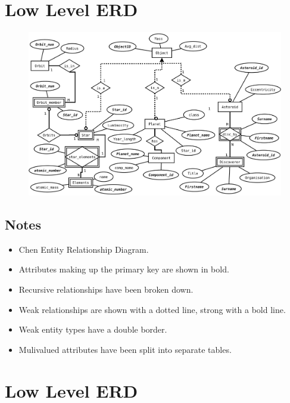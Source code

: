 \documentclass[11pt]{article} %
\begin{document}


\newpage
\section{Low Level ERD}

\begin{figure}[h]
	\centering
	\includegraphics[width=1.0\textwidth]{ERD-low-Chen.pdf}
\end{figure}

\subsection{Notes}

\begin{itemize}
	\item Chen Entity Relationship Diagram.
	\item Attributes making up the primary key are shown in bold.
	\item Recursive relationships have been broken down.
	\item Weak relationships are shown with a dotted line, strong with a bold
		line.
	\item Weak entity types have a double border.
	\item Mulivalued attributes have been split into separate tables.
\end{itemize}



\newpage
\section{Low Level ERD}
\end{document}
